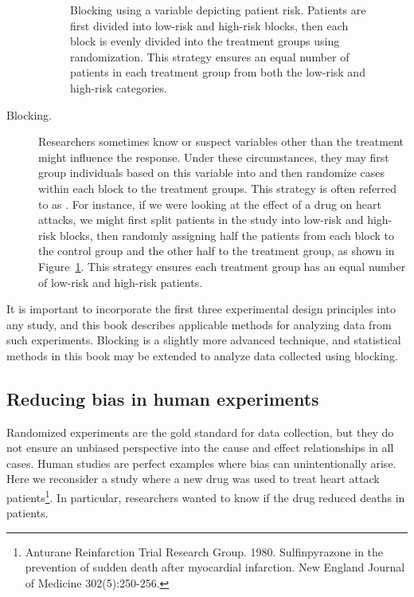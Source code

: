 \begin{description}
\begin{figure}
\caption{Blocking using a variable depicting patient risk. Patients are first divided into low-risk and high-risk blocks, then each block is evenly divided into the treatment groups using randomization. This strategy ensures an equal number of patients in each treatment group from both the low-risk and high-risk categories.}
\label{figureShowingBlocking}
\end{figure}
\item[Blocking.] Researchers sometimes know or suspect variables other than the treatment might influence the response. Under these circumstances, they may first group individuals based on this variable into  and then randomize cases within each block to the treatment groups. This strategy is often referred to as . For instance, if we were looking at the effect of a drug on heart attacks, we might first split patients in the study into low-risk and high-risk blocks, then randomly assigning half the patients from each block to the control group and the other half to the treatment group, as shown in Figure~\ref{figureShowingBlocking}. This strategy ensures each treatment group has an equal number of low-risk and high-risk patients.
\end{description}

It is important to incorporate the first three experimental design principles into any study, and this book describes applicable methods for analyzing data from such experiments. Blocking is a slightly more advanced technique, and statistical methods in this book may be extended to analyze data collected using blocking. 

\subsection{Reducing bias in human experiments}
\label{biasInHumanExperiments}

Randomized experiments are the gold standard for data collection, but they do not ensure an unbiased perspective into the cause and effect relationships in all cases. Human studies are perfect examples where bias can unintentionally arise. Here we reconsider a study where a new drug was used to treat heart attack patients\footnote{Anturane Reinfarction Trial Research Group. 1980. Sulfinpyrazone in the prevention of sudden death after myocardial infarction. New England Journal of Medicine 302(5):250-256.}. In particular, researchers wanted to know if the drug reduced deaths in patients.

